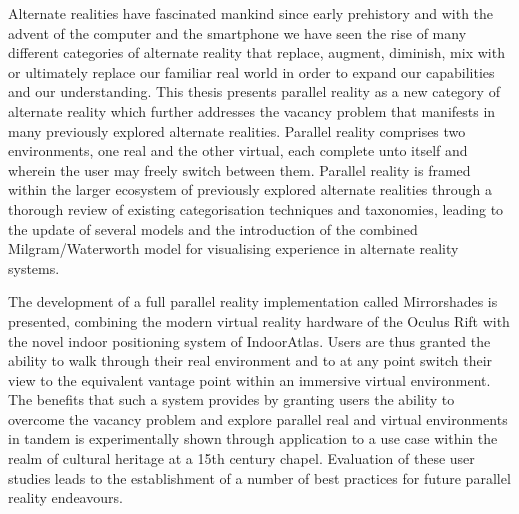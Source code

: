 Alternate realities have fascinated mankind since early prehistory and with the advent of the computer and the smartphone we have seen the rise of many different categories of alternate reality that replace, augment, diminish, mix with or ultimately replace our familiar real world in order to expand our capabilities and our understanding. This thesis presents parallel reality as a new category of alternate reality which further addresses the vacancy problem that manifests in many previously explored alternate realities. Parallel reality comprises two environments, one real and the other virtual, each complete unto itself and wherein the user may freely switch between them. Parallel reality is framed within the larger ecosystem of previously explored alternate realities through a thorough review of existing categorisation techniques and taxonomies, leading to the update of several models and the introduction of the combined Milgram/Waterworth model for visualising experience in alternate reality systems.

The development of a full parallel reality implementation called Mirrorshades is presented, combining the modern virtual reality hardware of the Oculus Rift with the novel indoor positioning system of IndoorAtlas. Users are thus granted the ability to walk through their real environment and to at any point switch their view to the equivalent vantage point within an immersive virtual environment. The benefits that such a system provides by granting users the ability to overcome the vacancy problem and explore parallel real and virtual environments in tandem is experimentally shown through application to a use case within the realm of cultural heritage at a 15th century chapel. Evaluation of these user studies leads to the establishment of a number of best practices for future parallel reality endeavours.